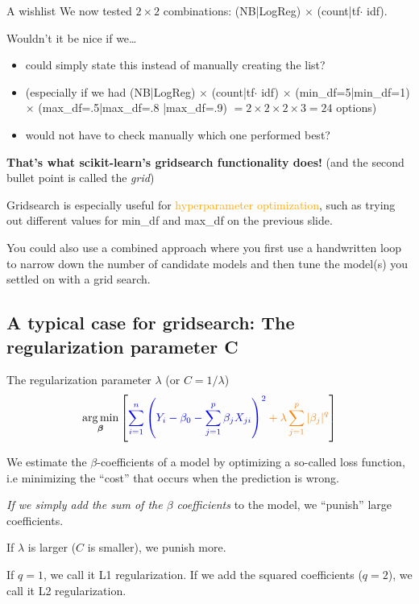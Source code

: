 \begin{frame}{A wishlist}
  We now tested $2\times 2$ combinations: (NB|LogReg) $\times$ (count|tf$\cdot$ idf).

  Wouldn't it be nice if we\ldots
  \begin{itemize}[<+->]
  \item could simply state this instead of manually creating the list?
  \item (especially if we had  (NB|LogReg) $\times$ (count|tf$\cdot$ idf)  $\times$ (min\_df=5|min\_df=1)  $\times$ (max\_df=.5|max\_df=.8 |max\_df=.9)  $= 2\times 2\times 2\times 3 = 24$ options)
  \item would not have to check manually which one performed best?
  \end{itemize}
\pause
\textbf{That's what scikit-learn's gridsearch functionality does!} (and the second bullet point is called the \textit{grid})
\end{frame}


\begin{frame}[standout]
Gridsearch is especially useful for \textcolor{orange}{hyperparameter optimization}, such as trying out different values for min\_df and max\_df on the previous slide.

You could also use a combined approach where you first use a handwritten loop to narrow down the number of candidate models and then tune the model(s) you settled on with a grid search.
\end{frame}


\subsection{A typical case for gridsearch: The regularization parameter C}


\begin{frame}{The regularization parameter $\lambda$ (or $C = 1/\lambda$)}
$$
\underset{\boldsymbol{\beta}}{\arg \min }\left[\color{blue} \sum_{i=1}^{n}\left(Y_{i}-\beta_{0}-\sum_{j=1}^{p} \beta_{j} X_{j i}\right)^{2}\color{orange} +\lambda \sum_{j=1}^{p}\left|\beta_{j}\right|^{q} \color{black} \right]
$$

\color{blue}We estimate the $\beta$-coefficients of a model by optimizing a so-called loss function, i.e minimizing the ``cost'' that occurs when the prediction is wrong.

\color{orange} \emph{If we simply add the sum of the $\beta$ coefficients} to the model, we ``punish'' large coefficients.
\color{black}
\pause

If $\lambda$ is larger ($C$ is smaller), we punish more.

\tiny{If $q=1$, we call it L1 regularization. If we add the squared coefficients ($q=2$), we call it L2 regularization.}
\end{frame}



